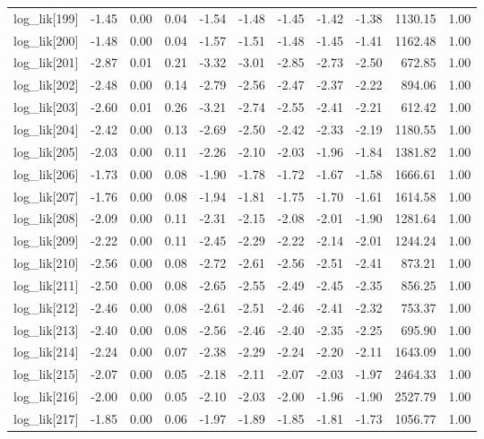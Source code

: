\begin{table}[ht]
\begin{tabular}{rrrrrrrrrrr}
  log\_lik[199] & -1.45 & 0.00 & 0.04 & -1.54 & -1.48 & -1.45 & -1.42 & -1.38 & 1130.15 & 1.00 \\ 
  log\_lik[200] & -1.48 & 0.00 & 0.04 & -1.57 & -1.51 & -1.48 & -1.45 & -1.41 & 1162.48 & 1.00 \\ 
  log\_lik[201] & -2.87 & 0.01 & 0.21 & -3.32 & -3.01 & -2.85 & -2.73 & -2.50 & 672.85 & 1.00 \\ 
  log\_lik[202] & -2.48 & 0.00 & 0.14 & -2.79 & -2.56 & -2.47 & -2.37 & -2.22 & 894.06 & 1.00 \\ 
  log\_lik[203] & -2.60 & 0.01 & 0.26 & -3.21 & -2.74 & -2.55 & -2.41 & -2.21 & 612.42 & 1.00 \\ 
  log\_lik[204] & -2.42 & 0.00 & 0.13 & -2.69 & -2.50 & -2.42 & -2.33 & -2.19 & 1180.55 & 1.00 \\ 
  log\_lik[205] & -2.03 & 0.00 & 0.11 & -2.26 & -2.10 & -2.03 & -1.96 & -1.84 & 1381.82 & 1.00 \\ 
  log\_lik[206] & -1.73 & 0.00 & 0.08 & -1.90 & -1.78 & -1.72 & -1.67 & -1.58 & 1666.61 & 1.00 \\ 
  log\_lik[207] & -1.76 & 0.00 & 0.08 & -1.94 & -1.81 & -1.75 & -1.70 & -1.61 & 1614.58 & 1.00 \\ 
  log\_lik[208] & -2.09 & 0.00 & 0.11 & -2.31 & -2.15 & -2.08 & -2.01 & -1.90 & 1281.64 & 1.00 \\ 
  log\_lik[209] & -2.22 & 0.00 & 0.11 & -2.45 & -2.29 & -2.22 & -2.14 & -2.01 & 1244.24 & 1.00 \\ 
  log\_lik[210] & -2.56 & 0.00 & 0.08 & -2.72 & -2.61 & -2.56 & -2.51 & -2.41 & 873.21 & 1.00 \\ 
  log\_lik[211] & -2.50 & 0.00 & 0.08 & -2.65 & -2.55 & -2.49 & -2.45 & -2.35 & 856.25 & 1.00 \\ 
  log\_lik[212] & -2.46 & 0.00 & 0.08 & -2.61 & -2.51 & -2.46 & -2.41 & -2.32 & 753.37 & 1.00 \\ 
  log\_lik[213] & -2.40 & 0.00 & 0.08 & -2.56 & -2.46 & -2.40 & -2.35 & -2.25 & 695.90 & 1.00 \\ 
  log\_lik[214] & -2.24 & 0.00 & 0.07 & -2.38 & -2.29 & -2.24 & -2.20 & -2.11 & 1643.09 & 1.00 \\ 
  log\_lik[215] & -2.07 & 0.00 & 0.05 & -2.18 & -2.11 & -2.07 & -2.03 & -1.97 & 2464.33 & 1.00 \\ 
  log\_lik[216] & -2.00 & 0.00 & 0.05 & -2.10 & -2.03 & -2.00 & -1.96 & -1.90 & 2527.79 & 1.00 \\ 
  log\_lik[217] & -1.85 & 0.00 & 0.06 & -1.97 & -1.89 & -1.85 & -1.81 & -1.73 & 1056.77 & 1.00 \\ 

\end{tabular}
\end{table}
